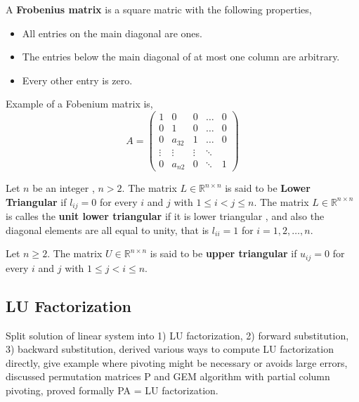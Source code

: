 \documentclass{article}
\theoremstyle{remark}
\begin{document}
\begin{definition}
   A \textbf{Frobenius matrix}  is a square matric with the following properties,
   \begin{itemize}
     \item All entries on the main diagonal are ones.
     \item The entries below the main diagonal of at most one column are arbitrary.
     \item Every other entry is zero.
   \end{itemize}
 \end{definition}

 Example of a Fobenium matrix is,
 \[
   A = 
   \begin{pmatrix}
     1 & 0 & 0 & \ldots & 0 \\
     0 & 1 & 0 & \ldots & 0 \\
     0 & a_{32} & 1 & \ldots & 0 \\
     \vdots & \vdots & \vdots  & \ddots \\
     0  & a_{n 2}  & 0  & \ddots  &  1
   \end{pmatrix} 
 \] 


 \begin{definition}
   Let $n$ be an integer , $n> 2$. The matrix $L \in \mathbb{R}^{n\times n}$ is said to be \textbf{Lower Triangular} if $l_{ij} = 0$ for every $i$ and $j$ with $1 \le i < j \le n$. The matrix $L \in \mathbb{R}^{n\times n }$ is calles the \textbf{unit lower triangular }  if it is lower triangular , and also the diagonal elements are all equal to unity, that is $l_{ii} = 1$  for $i = 1,2, \ldots , n$.
   \par 
   Let $n\ge 2 $.  The matrix $U \in \mathbb{R}^{n\times n}$ is said to be \textbf{upper triangular }  if $ u_{ij} = 0$ for every $i$ and $j$ with $1 \le j < i \le n$.
 \end{definition}
 

\subsection{LU Factorization}%
\label{sub:lu_factorization}
\begin{tcolorbox}
  Split solution of linear system into 1) LU factorization, 2) forward substitution, 3) backward substitution, derived various ways to compute LU factorization directly, give example where pivoting might be necessary or avoids large errors,  discussed permutation matrices P and GEM algorithm with partial column pivoting, proved formally PA = LU factorization. 
\end{tcolorbox}
\end{document}
